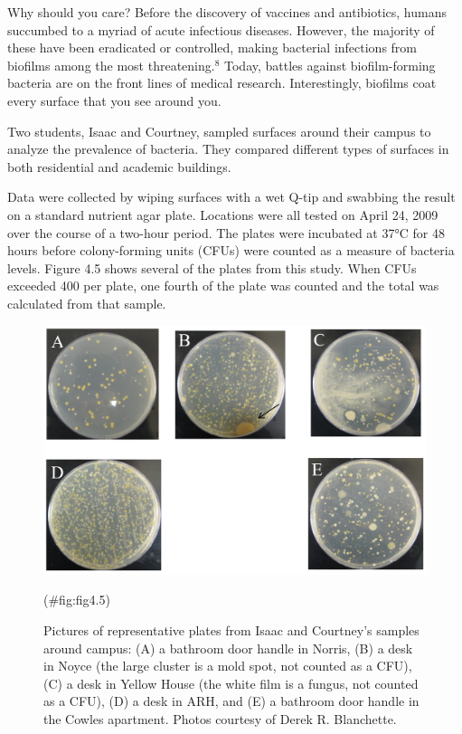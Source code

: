 \documentclass[
]{report}
\begin{document}
\begin{list}{E.}{ \setlength{\itemsep}{1.2em}}
Why should you care? Before the discovery of vaccines and antibiotics, humans succumbed to a myriad of acute infectious diseases. However, the majority of these have been eradicated or controlled, making bacterial infections from biofilms among the most threatening.$^8$ Today, battles against biofilm-forming bacteria are on the front lines of medical research. Interestingly, biofilms coat every surface that you see around you.

Two students, Isaac and Courtney, sampled surfaces around their campus to analyze the prevalence of bacteria. They compared different types of surfaces in both residential and academic buildings.

Data were collected by wiping surfaces with a wet Q-tip and swabbing the result on a standard nutrient agar plate. Locations were all tested on April 24, 2009 over the course of a two-hour period. The plates were incubated at 37°C for 48 hours before colony-forming units (CFUs) were counted as a measure of bacteria levels. Figure 4.5 shows several of the plates from this study. When CFUs exceeded 400 per plate, one fourth of the plate was counted and the total was calculated from that sample.

\begin{figure}

{\centering \includegraphics[width=0.8\linewidth]{docs/Fig4_5_Bacteria} 

}

\caption{Pictures of representative plates from Isaac and Courtney’s samples around campus: (A) a bathroom door handle in Norris, (B) a desk in Noyce (the large cluster is a mold spot, not counted as a CFU), (C) a desk in Yellow House (the white film is a fungus, not counted as a CFU), (D) a desk in ARH, and (E) a bathroom door handle in the Cowles apartment. Photos courtesy of Derek R. Blanchette.}(\#fig:fig4.5)
\end{figure}



\end{list}
\end{document}
